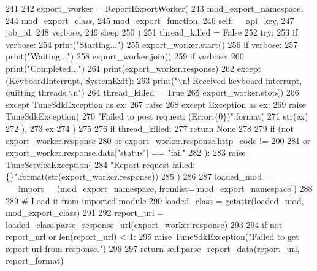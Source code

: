 \begin{DoxyCode}
241 
242         export\_worker = ReportExportWorker(
243             mod\_export\_namespace,
244             mod\_export\_class,
245             mod\_export\_function,
246             self.\hyperlink{classtune_1_1management_1_1reports_1_1reports__base_1_1ReportsBase_a11cc8a3041bc8b00d69f19c743db691c}{\_\_api\_key},
247             job\_id,
248             verbose,
249             sleep
250         )
251         thread\_killed = \textcolor{keyword}{False}
252         \textcolor{keywordflow}{try}:
253             \textcolor{keywordflow}{if} verbose:
254                 print(\textcolor{stringliteral}{"Starting..."})
255             export\_worker.start()
256             \textcolor{keywordflow}{if} verbose:
257                 print(\textcolor{stringliteral}{"Waiting..."})
258             export\_worker.join()
259             \textcolor{keywordflow}{if} verbose:
260                 print(\textcolor{stringliteral}{"Completed..."})
261                 print(export\_worker.response)
262         \textcolor{keywordflow}{except} (KeyboardInterrupt, SystemExit):
263             print(\textcolor{stringliteral}{"\(\backslash\)n! Received keyboard interrupt, quitting threads.\(\backslash\)n"})
264             thread\_killed = \textcolor{keyword}{True}
265             export\_worker.stop()
266         \textcolor{keywordflow}{except} TuneSdkException \textcolor{keyword}{as} ex:
267             \textcolor{keywordflow}{raise}
268         \textcolor{keywordflow}{except} Exception \textcolor{keyword}{as} ex:
269             \textcolor{keywordflow}{raise} TuneSdkException(
270                 \textcolor{stringliteral}{"Failed to post request: (Error:\{0\})"}.format(
271                     str(ex)
272                     ),
273                 ex
274                 )
275 
276         \textcolor{keywordflow}{if} thread\_killed:
277             \textcolor{keywordflow}{return} \textcolor{keywordtype}{None}
278 
279         \textcolor{keywordflow}{if} (\textcolor{keywordflow}{not} export\_worker.response
280             \textcolor{keywordflow}{or} export\_worker.response.http\_code != 200
281             \textcolor{keywordflow}{or} export\_worker.response.data[\textcolor{stringliteral}{"status"}] == \textcolor{stringliteral}{"fail"}
282         ):
283             \textcolor{keywordflow}{raise} TuneServiceException(
284                 \textcolor{stringliteral}{"Report request failed: \{\}"}.format(str(export\_worker.response))
285                 )
286 
287         loaded\_mod = \_\_import\_\_(mod\_export\_namespace, fromlist=[mod\_export\_namespace])
288 
289         \textcolor{comment}{# Load it from imported module}
290         loaded\_class = getattr(loaded\_mod, mod\_export\_class)
291 
292         report\_url = loaded\_class.parse\_response\_url(export\_worker.response)
293 
294         \textcolor{keywordflow}{if} \textcolor{keywordflow}{not} report\_url \textcolor{keywordflow}{or} len(report\_url) < 1:
295             \textcolor{keywordflow}{raise} TuneSdkException(\textcolor{stringliteral}{"Failed to get report url from response."})
296 
297         \textcolor{keywordflow}{return} self.\hyperlink{classtune_1_1management_1_1reports_1_1reports__base_1_1ReportsBase_ab256e31b545798be9e0d3a00513bcf7a}{parse\_report\_data}(report\_url, report\_format)


\end{DoxyCode}
